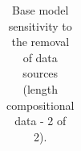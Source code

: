 \documentclass[
]{scrartcl}
\begin{document}
\begin{landscape}
\begin{longtable}[t]
\end{longtable}

\endgroup{}


\end{landscape}

\clearpage

\begin{landscape}
\begingroup\fontsize{9}{11}\selectfont

\begin{longtable}[t]{ll>{\raggedright\arraybackslash}p{4em}>{\raggedright\arraybackslash}p{4em}>{\raggedright\arraybackslash}p{4em}>{\raggedright\arraybackslash}p{4em}>{\raggedright\arraybackslash}p{4em}>{\raggedright\arraybackslash}p{4em}}

\caption{\label{tbl-sensitivities-like-comps-len2}Base model sensitivity
to the removal of data sources (length compositional data - 2 of 2).}

\tabularnewline


\end{longtable}
\end{landscape}
\end{document}

